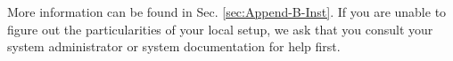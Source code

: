 \documentclass[11pt,oneside]{report} %
\newcommand{\program}[1]{\textsc{#1}}
\newcommand{\feff}{\program{feff}}
\newcommand{\file}[1]{`\texttt{#1}'}
\newcommand{\module}[1]{\textrm{\bf{#1}}}
\begin{document}
More information can be found in Sec. \ref{sec:Append-B-Inst}.  If you are unable to figure out the particularities of your local setup, we ask that you consult your system administrator or system documentation for help first.

%
%
%
%
%


%
%
%
%
%
%
\end{document}
